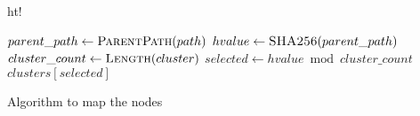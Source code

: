 \begin{algorithm}{ht!}
	\begin{algorithmic}
		\State $parent\_path \gets \Call{ParentPath}{path}$
		\State $hvalue \gets \Call{SHA256}{parent\_path}$
		\State $cluster\_count \gets \Call{Length}{cluster}$
		\State $selected \gets hvalue \bmod cluster\_count$
		\State \Return  $clusters[selected]$
		\EndProcedure
	\end{algorithmic}
\caption{Algorithm to map the nodes}
\label{algo:nodeMapping}
\end{algorithm}
